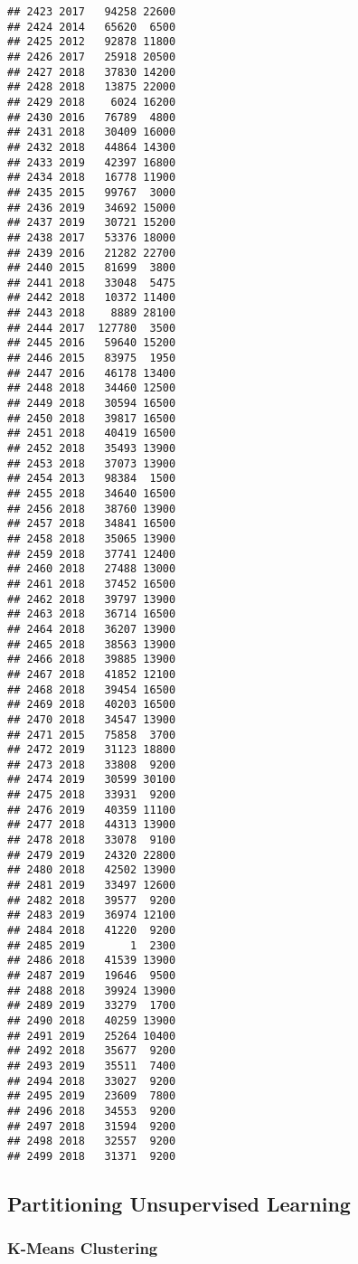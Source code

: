 \documentclass[
]{article}
\begin{document}
\begin{verbatim}
## 2423 2017   94258 22600
## 2424 2014   65620  6500
## 2425 2012   92878 11800
## 2426 2017   25918 20500
## 2427 2018   37830 14200
## 2428 2018   13875 22000
## 2429 2018    6024 16200
## 2430 2016   76789  4800
## 2431 2018   30409 16000
## 2432 2018   44864 14300
## 2433 2019   42397 16800
## 2434 2018   16778 11900
## 2435 2015   99767  3000
## 2436 2019   34692 15000
## 2437 2019   30721 15200
## 2438 2017   53376 18000
## 2439 2016   21282 22700
## 2440 2015   81699  3800
## 2441 2018   33048  5475
## 2442 2018   10372 11400
## 2443 2018    8889 28100
## 2444 2017  127780  3500
## 2445 2016   59640 15200
## 2446 2015   83975  1950
## 2447 2016   46178 13400
## 2448 2018   34460 12500
## 2449 2018   30594 16500
## 2450 2018   39817 16500
## 2451 2018   40419 16500
## 2452 2018   35493 13900
## 2453 2018   37073 13900
## 2454 2013   98384  1500
## 2455 2018   34640 16500
## 2456 2018   38760 13900
## 2457 2018   34841 16500
## 2458 2018   35065 13900
## 2459 2018   37741 12400
## 2460 2018   27488 13000
## 2461 2018   37452 16500
## 2462 2018   39797 13900
## 2463 2018   36714 16500
## 2464 2018   36207 13900
## 2465 2018   38563 13900
## 2466 2018   39885 13900
## 2467 2018   41852 12100
## 2468 2018   39454 16500
## 2469 2018   40203 16500
## 2470 2018   34547 13900
## 2471 2015   75858  3700
## 2472 2019   31123 18800
## 2473 2018   33808  9200
## 2474 2019   30599 30100
## 2475 2018   33931  9200
## 2476 2019   40359 11100
## 2477 2018   44313 13900
## 2478 2018   33078  9100
## 2479 2019   24320 22800
## 2480 2018   42502 13900
## 2481 2019   33497 12600
## 2482 2018   39577  9200
## 2483 2019   36974 12100
## 2484 2018   41220  9200
## 2485 2019       1  2300
## 2486 2018   41539 13900
## 2487 2019   19646  9500
## 2488 2018   39924 13900
## 2489 2019   33279  1700
## 2490 2018   40259 13900
## 2491 2019   25264 10400
## 2492 2018   35677  9200
## 2493 2019   35511  7400
## 2494 2018   33027  9200
## 2495 2019   23609  7800
## 2496 2018   34553  9200
## 2497 2018   31594  9200
## 2498 2018   32557  9200
## 2499 2018   31371  9200
\end{verbatim}

\hypertarget{partitioning-unsupervised-learning}{%
\subsection{Partitioning Unsupervised
Learning}\label{partitioning-unsupervised-learning}}

\hypertarget{k-means-clustering}{%
\subsubsection{K-Means Clustering}\label{k-means-clustering}}
\end{document}
